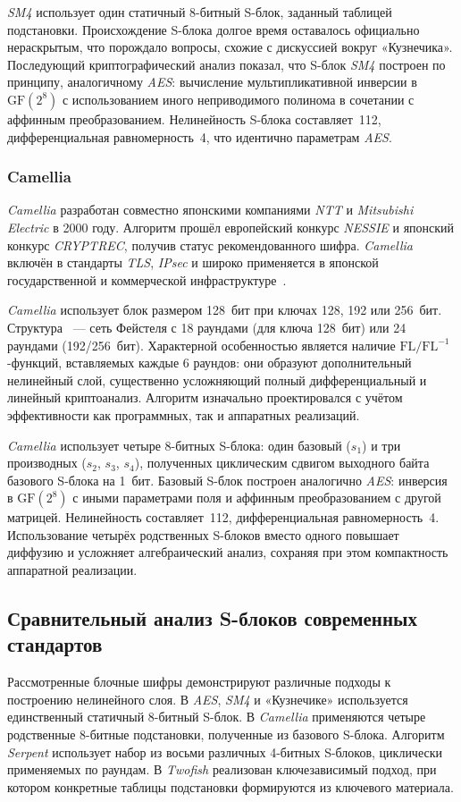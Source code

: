 \textit{SM4} использует один статичный 8-битный S-блок, заданный таблицей подстановки.
Происхождение S-блока долгое время оставалось официально нераскрытым,
что порождало вопросы, схожие с дискуссией вокруг «Кузнечика». Последующий
криптографический анализ показал, что S-блок \textit{SM4} построен по принципу,
аналогичному \textit{AES}: вычисление мультипликативной инверсии в $\mathrm{GF}(2^8)$
с использованием иного неприводимого полинома в сочетании с аффинным
преобразованием. Нелинейность S-блока составляет~112, дифференциальная
равномерность~4, что идентично параметрам \textit{AES}.


\subsubsection{Camellia}

\textit{Camellia }разработан совместно японскими компаниями \textit{NTT} и \textit{Mitsubishi Electric}
в 2000 году. Алгоритм прошёл европейский конкурс \textit{NESSIE}
и японский конкурс \textit{CRYPTREC}, получив статус рекомендованного шифра.
\textit{Camellia} включён в стандарты \textit{TLS}, \textit{IPsec} и широко применяется
в японской государственной и коммерческой инфраструктуре~\cite{camellia2001}.

\textit{Camellia }использует блок размером 128~бит при ключах 128, 192 или 256~бит.
Структура~ — сеть Фейстеля с 18 раундами (для ключа 128~бит) или 24 раундами
(192/256~бит). Характерной особенностью является наличие
$\mathrm{FL}/\mathrm{FL}^{-1}$-функций, вставляемых каждые 6 раундов:
они образуют дополнительный нелинейный слой, существенно усложняющий полный
дифференциальный и линейный криптоанализ. Алгоритм изначально проектировался
с учётом эффективности как программных, так и аппаратных реализаций.


\textit{Camellia} использует четыре 8-битных S-блока: один базовый ($s_1$) и три
производных ($s_2$, $s_3$, $s_4$), полученных циклическим сдвигом выходного
байта базового S-блока на 1~бит. Базовый S-блок построен аналогично \textit{AES}:
инверсия в $\mathrm{GF}(2^8)$ с иными параметрами поля и аффинным
преобразованием с другой матрицей. Нелинейность составляет~112,
дифференциальная равномерность~4. Использование четырёх родственных
S-блоков вместо одного повышает диффузию и усложняет алгебраический анализ,
сохраняя при этом компактность аппаратной реализации.

\subsection{Сравнительный анализ S-блоков современных стандартов}
Рассмотренные блочные шифры демонстрируют различные подходы к построению
нелинейного слоя. В \textit{AES}, \textit{SM4} и «Кузнечике» используется
единственный статичный 8-битный S-блок. В \textit{Camellia} применяются
четыре родственные 8-битные подстановки, полученные из базового S-блока.
Алгоритм \textit{Serpent} использует набор из восьми различных 4-битных
S-блоков, циклически применяемых по раундам. В \textit{Twofish} реализован
ключезависимый подход, при котором конкретные таблицы подстановки
формируются из ключевого материала.


